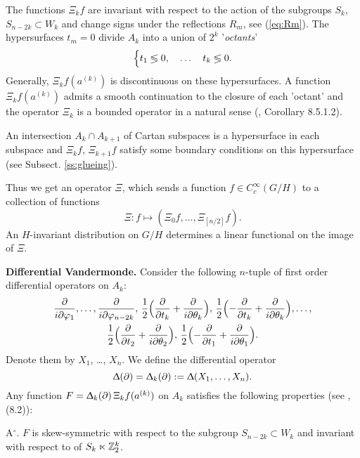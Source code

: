 \documentclass{article}
\newcounter{sec}
\def\sm{\smallskip}
\newcounter{punct}[sec]
\def\punct{\refstepcounter{punct}{\arabic{sec}.\arabic{punct}.  }}
\begin{document}
The functions $\Xi_k f$ are invariant with respect to the action of the subgroups 
$S_k$, $S_{n-2k}\subset W_k$ and  change signs under the reflections $R_m$, see
(\ref{eq:Rm}).
The  hypersurfaces $t_m=0$ divide $A_k$ into a union of 
$2^k$
'{\it octants}'
\begin{equation}
\Bigl\{
t_1\lessgtr 0,\quad\dots\quad t_k\lessgtr 0.
\label{eq:octant}
\end{equation}
 Generally, $\Xi_kf(a^{(k)})$
is discontinuous on these hypersurfaces. A function  $\Xi_k f(a^{(k)})$ admits a 
smooth continuation to the closure of each 'octant' and the operator $\Xi_k$
is a bounded operator in a natural sense (\cite{War}, Corollary 8.5.1.2).


An intersection $A_k\cap A_{k+1}$ of Cartan subspaces  is a hypersurface 
in each subspace and $\Xi_k f$, $\Xi_{k+1} f$ satisfy some boundary conditions on this hypersurface
(see Subsect. \ref{ss:glueing}).

\sm

Thus we get an operator
$\Xi$, which sends a function $f\in C_c^\infty(G/H)$
to a collection of functions
$$
\Xi:f\mapsto
(\Xi_0 f, \dots, \Xi_{[n/2]} f).
$$
An $H$-invariant distribution on $G/H$ determines a linear functional
on the image of $\Xi$.

\sm

{\bf \punct Differential Vandermonde.}
Consider the following $n$-tuple of first order differential operators
on $A_k$:
\begin{multline}
 \frac\partial{i \partial \phi_1},\dots,  \frac\partial{i \partial \phi_{n-2k}}, \,
 \frac 12 \Bigl(\frac \partial{\partial t_k}+ \frac\partial{i \partial \theta_k} \Bigr),\, 
 \frac 12 \Bigl(-\frac \partial{\partial t_k}+ \frac\partial{i \partial \theta_k} \Bigr),
 \dots, \\
  \frac 12 \Bigl(\frac \partial{\partial t_2}+ \frac\partial{i \partial \theta_2} \Bigr), \,
 \frac 12 \Bigl(-\frac \partial{\partial t_1}+ \frac\partial{i \partial \theta_1} \Bigr).
 \label{eq:X-n}
\end{multline}
Denote them by $X_1$, \dots, $X_n$.
We define the differential operator
$$
\Updelta(\partial)=\Updelta_k(\partial):=\Updelta(X_1,\dots, X_n).
$$
Any function 
$F=\Updelta_k(\partial)\,\Xi_k f(a^{(k)})$
on $A_k$ satisfies the following properties (see \cite{San}, (8.2)):

\sm

A$^\circ$. $F$ is skew-symmetric with respect
to the subgroup $S_{n-2k}\subset W_k$ and invariant with respect to 
of $S_k\ltimes {\mathbb Z}_2^{k}$.
\end{document}
